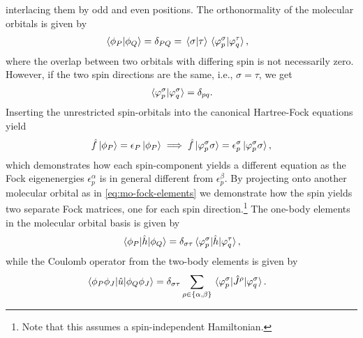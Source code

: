             interlacing them by odd and even positions.
            The orthonormality of the molecular orbitals is given by
            \begin{align}
                \braket*{\phi_P}{\phi_Q}
                &= \delta_{PQ}
                = \braket*{\sigma}{\tau}
                \braket*{\varphi^{\sigma}_{p}}{\varphi^{\tau}_{q}},
            \end{align}
            where the overlap between two orbitals with differing spin is not
            necessarily zero.
            However, if the two spin directions are the same, i.e., $\sigma =
            \tau$, we get
            \begin{align}
                \braket*{\varphi^{\sigma}_{p}}{\varphi^{\sigma}_{q}}
                = \delta_{pq}.
            \end{align}
            Inserting the unrestricted spin-orbitals into the canonical
            Hartree-Fock equations yield
            \begin{align}
                \hat{f}\ket*{\phi_P}
                = \epsilon_P\ket*{\phi_P}
                \implies
                \hat{f}\ket*{\varphi^{\sigma}_{p}\sigma}
                = \epsilon^{\sigma}_{p}\ket*{\varphi^{\sigma}_{p} \sigma},
            \end{align}
            which demonstrates how each spin-component yields a different
            equation as the Fock eigenenergies $\epsilon^{\alpha}_{p}$ is in
            general different from $\epsilon^{\beta}_{p}$.
            By projecting onto another molecular orbital as in
            \autoref{eq:mo-fock-elements} we demonstrate how the spin yields two
            separate Fock matrices, one for each spin direction.\footnote{%
                Note that this assumes a spin-independent Hamiltonian.
            }
            The one-body elements in the molecular orbital basis is given by
            \begin{align}
                \mel*{\phi_P}{\hat{h}}{\phi_Q}
                = \delta_{\sigma\tau}
                \mel*{\varphi^{\sigma}_{p}}{
                    \hat{h}
                }{\varphi^{\tau}_{q}},
            \end{align}
            while the Coulomb operator from the two-body elements is given by
            \begin{align}
                \mel*{\phi_P\phi_J}{
                    \hat{u}
                }{\phi_Q\phi_J}
                &=
                \delta_{\sigma\tau}
                \sum_{\rho \in \left\{ \alpha, \beta \right\}}
                \mel*{\varphi^{\sigma}_{p}}{
                    \hat{J}^{\rho}
                }{\varphi^{\sigma}_{q}}.
            \end{align}
